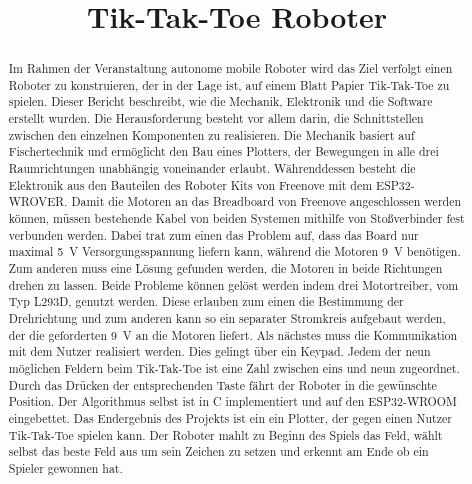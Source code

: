\documentclass[conference,compsoc,final,a4paper]{IEEEtran}
\newcommand{\autorA}[0]{Büchner, Jannis}
\newcommand{\autorB}[0]{Büchner, Niklas}
\newcommand{\autorC}[0]{Vierling, Jörg}
\newcommand{\dokumententitel}[0]{Tik-Tak-Toe Roboter}
\begin{document}
\title{\dokumententitel}

\author{
  \IEEEauthorblockN{
    \autorA\\
    \autorB\\
    \autorC
  }
}

\maketitle
\thispagestyle{plain}
\pagestyle{plain}


\begin{abstract}

Im Rahmen der Veranstaltung autonome mobile Roboter wird das Ziel verfolgt einen Roboter zu konstruieren, der in der Lage ist, auf einem Blatt Papier Tik-Tak-Toe zu spielen. Dieser Bericht beschreibt, wie die Mechanik, Elektronik und die Software erstellt wurden. 
Die Herausforderung besteht vor allem darin, die Schnittstellen zwischen den einzelnen Komponenten zu realisieren. Die Mechanik basiert auf Fischertechnik und ermöglicht den Bau eines Plotters, der Bewegungen in alle drei Raumrichtungen unabhängig voneinander erlaubt. Währenddessen besteht die Elektronik aus den Bauteilen des Roboter Kits von Freenove mit dem ESP32-WROVER. Damit die Motoren an das Breadboard von Freenove angeschlossen werden können, müssen bestehende Kabel von beiden Systemen mithilfe von Stoßverbinder fest verbunden werden. Dabei trat zum einen das Problem auf, dass das Board nur maximal \qty{5}{V} Versorgungsspannung liefern kann, während die Motoren \qty{9}{V} benötigen. Zum anderen muss eine Lösung gefunden werden, die Motoren in beide Richtungen drehen zu lassen. Beide Probleme können gelöst werden indem drei Motortreiber, vom Typ L293D,  genutzt werden. Diese erlauben zum einen die Bestimmung der Drehrichtung und zum anderen kann so ein separater Stromkreis aufgebaut werden, der die geforderten \qty{9}{V} an die Motoren liefert. Als nächstes muss die Kommunikation mit dem Nutzer realisiert werden. Dies gelingt über ein Keypad. Jedem der neun möglichen Feldern beim Tik-Tak-Toe ist eine Zahl zwischen eins und neun zugeordnet. Durch das Drücken der entsprechenden Taste fährt der Roboter in die gewünschte Position. Der Algorithmus selbst ist in C implementiert und auf den ESP32-WROOM eingebettet. 
Das Endergebnis des Projekts ist ein ein Plotter, der gegen einen Nutzer Tik-Tak-Toe spielen kann. Der Roboter mahlt zu Beginn des Spiels das Feld, wählt selbst das beste Feld aus um sein Zeichen zu setzen und erkennt am Ende ob ein Spieler gewonnen hat.

\end{abstract}
\end{document}
